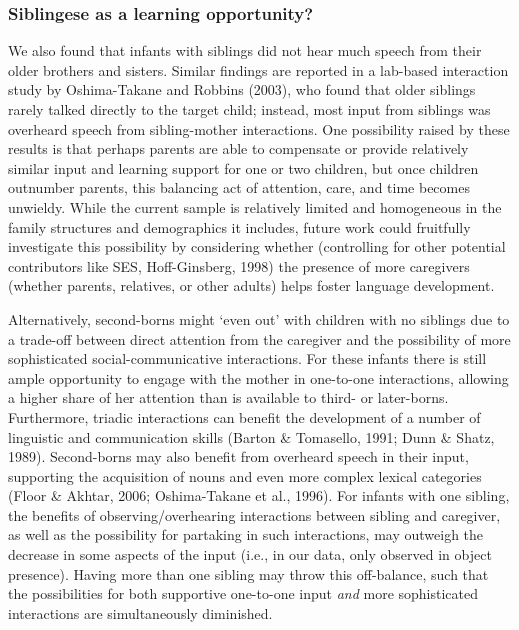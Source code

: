 \documentclass[
  man,mask,floatsintext]{apa6}
\begin{document}
\hypertarget{siblingese-as-a-learning-opportunity}{%
\subsubsection{Siblingese as a learning opportunity?}\label{siblingese-as-a-learning-opportunity}}

We also found that infants with siblings did not hear much speech from their older brothers and sisters. Similar findings are reported in a lab-based interaction study by Oshima-Takane and Robbins (2003), who found that older siblings rarely talked directly to the target child; instead, most input from siblings was overheard speech from sibling-mother interactions. One possibility raised by these results is that perhaps parents are able to compensate or provide relatively similar input and learning support for one or two children, but once children outnumber parents, this balancing act of attention, care, and time becomes unwieldy. While the current sample is relatively limited and homogeneous in the family structures and demographics it includes, future work could fruitfully investigate this possibility by considering whether (controlling for other potential contributors like SES, Hoff-Ginsberg, 1998) the presence of more caregivers (whether parents, relatives, or other adults) helps foster language development.

Alternatively, second-borns might `even out' with children with no siblings due to a trade-off between direct attention from the caregiver and the possibility of more sophisticated social-communicative interactions. For these infants there is still ample opportunity to engage with the mother in one-to-one interactions, allowing a higher share of her attention than is available to third- or later-borns. Furthermore, triadic interactions can benefit the development of a number of linguistic and communication skills (Barton \& Tomasello, 1991; Dunn \& Shatz, 1989). Second-borns may also benefit from overheard speech in their input, supporting the acquisition of nouns and even more complex lexical categories (Floor \& Akhtar, 2006; Oshima-Takane et al., 1996). For infants with one sibling, the benefits of observing/overhearing interactions between sibling and caregiver, as well as the possibility for partaking in such interactions, may outweigh the decrease in some aspects of the input (i.e., in our data, only observed in object presence). Having more than one sibling may throw this off-balance, such that the possibilities for both supportive one-to-one input \emph{and} more sophisticated interactions are simultaneously diminished.
\end{document}
